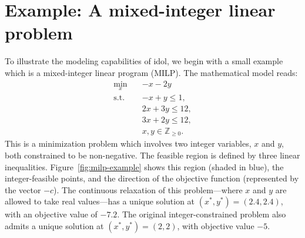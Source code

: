 \section{Example: A mixed-integer linear problem}
\label{sec:milp-example}

To illustrate the modeling capabilities of \textsf{idol}, we begin with a
small example which is a mixed-integer linear program (MILP). 
%
The mathematical model reads:
\begin{subequations}
    \label{eq:milp-example}
    \begin{align}
        \min_x \quad & -x - 2y \\
        \text{s.t.} & -x + y \le 1, \\
        & 2x + 3y \le 12, \\
        & 3x + 2y \le 12, \\
        & x,y\in\mathbb{Z}_{\ge 0}.
    \end{align}
\end{subequations}
This is a minimization problem which involves two integer variables, $x$ and
$y$, both constrained to be non-negative. The feasible region is defined by
three linear inequalities. Figure~\ref{fig:milp-example} shows this region
(shaded in blue), the integer-feasible points, and the direction of the
objective function (represented by the vector $-c$).
%
The continuous relaxation of this problem---where $x$ and $y$ are allowed to
take real values---has a unique solution at $(x^*, y^*) = (2.4, 2.4)$, with an
objective value of $-7.2$. The original integer-constrained problem also
admits a unique solution at $(x^*, y^*) = (2, 2)$, with objective value $-5$.

\newcommand{\drawPoint}[2]{\filldraw[orange] (#1,#2) circle (1.5pt) node[anchor=north west] {};}

